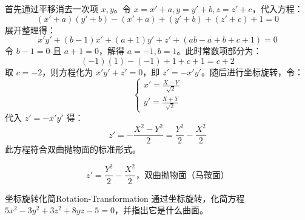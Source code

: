 \begin{solution}
    首先通过平移消去一次项 $x, y$。令 $x = x' + a, y = y' + b, z = z' + c$，代入方程：
    \begin{equation}
        (x' + a)(y' + b) - (x' + a) + (y' + b) + (z' + c) + 1 = 0
    \end{equation}
    展开整理得：
    \begin{equation}
        x'y' + (b - 1)x' + (a + 1)y' + z' + (ab - a + b + c + 1) = 0
    \end{equation}
    令 $b - 1 = 0$ 且 $a + 1 = 0$，解得 $a = -1, b = 1$。此时常数项部分为：
    \begin{equation}
        (-1)(1) - (-1) + 1 + c + 1 = c + 2
    \end{equation}
    取 $c = -2$，则方程化为 $x'y' + z' = 0$，即 $z' = -x'y'$。随后进行坐标旋转，令：
    \begin{equation}
        \begin{cases}
            x' = \frac{X - Y}{\sqrt{2}} \\
            y' = \frac{X + Y}{\sqrt{2}}
        \end{cases}
    \end{equation}
    代入 $z' = -x'y'$ 得：
    \begin{equation}
        z' = -\frac{X^2 - Y^2}{2} = \frac{Y^2}{2} - \frac{X^2}{2}
    \end{equation}
    此方程符合双曲抛物面的标准形式。

    \begin{equation}
        \boxed{z' = \frac{Y^2}{2} - \frac{X^2}{2}，\text{双曲抛物面（马鞍面）}}
    \end{equation}
\end{solution}

\begin{problem}{坐标旋转化简}{Rotation-Transformation}
    通过坐标旋转，化简方程 $5x^2 - 3y^2 + 3z^2 + 8yz - 5 = 0$，并指出它是什么曲面。
\end{problem}


